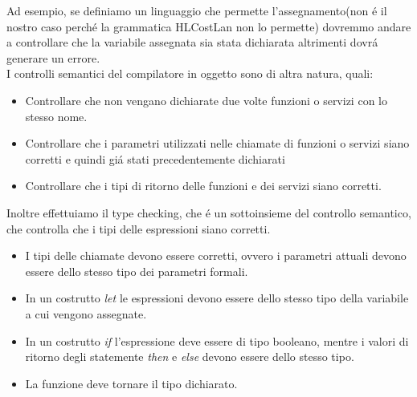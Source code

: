 \documentclass[../../main.tex]{subfiles}
\begin{document}
Ad esempio, se definiamo un linguaggio che permette l'assegnamento(non é il nostro caso perché la grammatica HLCostLan non lo permette) dovremmo andare a controllare che la variabile assegnata sia stata dichiarata altrimenti dovrá generare un errore.\\
I controlli semantici del compilatore in oggetto sono di altra natura, quali:
\begin{itemize}
    \item Controllare che non vengano dichiarate due volte funzioni o servizi con lo stesso nome.
    \item Controllare che i parametri utilizzati nelle chiamate di funzioni o servizi siano corretti e quindi giá stati precedentemente dichiarati
    \item Controllare che i tipi di ritorno delle funzioni e dei servizi siano corretti.
\end{itemize}
Inoltre effettuiamo il type checking, che é un sottoinsieme del controllo semantico, che controlla che i tipi delle espressioni siano corretti.\\
\begin{itemize}
    \item I tipi delle chiamate devono essere corretti, ovvero i parametri attuali devono essere dello stesso tipo dei parametri formali.
    \item In un costrutto \textit{let} le espressioni devono essere dello stesso tipo della variabile a cui vengono assegnate.
    \item In un costrutto \textit{if} l'espressione deve essere di tipo booleano, mentre i valori di ritorno degli statemente \textit{then} e \textit{else} devono essere dello stesso tipo.
    \item La funzione deve tornare il tipo dichiarato.
\end{itemize}
\end{document}
